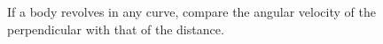 If a body revolves in any curve, compare the 
angular velocity of the perpendicular with
that of the distance.
